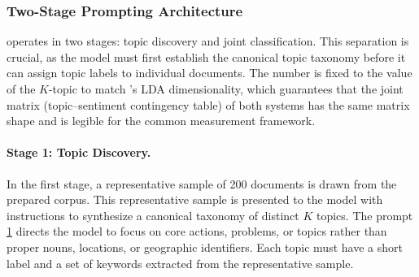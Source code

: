 \subsubsection{Two-Stage Prompting Architecture}

\sysB{} operates in two stages: topic discovery and joint classification. This
separation is crucial, as the model must first establish the canonical topic
taxonomy before it can assign topic labels to individual documents. The number
is fixed to the value of the $K$-topic to match \sysA's LDA dimensionality,
which guarantees that the joint matrix (topic--sentiment contingency table) of
both systems has the same matrix shape and is legible for the common
measurement framework.

\paragraph{Stage 1: Topic Discovery.}
In the first stage, a representative sample of 200 documents is drawn from the
prepared corpus. This representative sample is presented to the model with
instructions to synthesize a canonical taxonomy of distinct $K$ topics. The
prompt \hyperlink{lk:stage-1-prompt}{1} directs the model to focus on core actions, problems, or topics rather
than proper nouns, locations, or geographic identifiers. Each topic must have a
short label and a set of keywords extracted from the representative sample.

